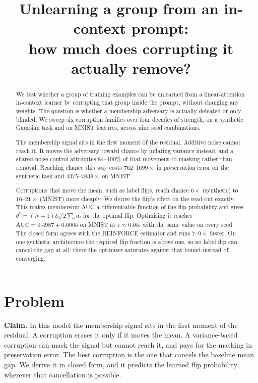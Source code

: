 \documentclass[11pt,a4paper]{article}
\title{\vspace{-1.4cm}\textbf{Unlearning a group from an in-context prompt:\\
how much does corrupting it actually remove?}}
\author{}
\date{}
\begin{document}
\maketitle
\vspace{-1.3cm}

\begin{abstract}
\noindent
We test whether a group of training examples can be unlearned from a
linear-attention in-context learner by corrupting that group inside the prompt,
without changing any weights. The question is whether a membership adversary is
actually defeated or only blinded. We sweep six corruption families over four
decades of strength, on a synthetic Gaussian task and on MNIST features, across
nine seed combinations.

The membership signal sits in the first moment of the residual. Additive noise
cannot reach it. It moves the adversary toward chance by inflating variance
instead, and a shared-noise control attributes $84$--$100\%$ of that movement to
masking rather than removal. Reaching chance this way costs $762$--$1699\times$
in preservation error on the synthetic task and $4375$--$7838\times$ on MNIST.

Corruptions that move the mean, such as label flips, reach chance $6\times$
(synthetic) to $16$--$21\times$ (MNIST) more cheaply. We derive the flip's
effect on the read-out exactly. This makes membership AUC a differentiable
function of the flip probability and gives $\theta^*=(N+1)\delta_0/2\sum_i a_i$
for the optimal flip. Optimising it reaches
$\mathrm{AUC}=0.4987\pm0.0005$ on MNIST at $\varepsilon\approx0.05$, with the
same value on every seed. The closed form agrees with the REINFORCE estimator
and runs $7$--$9\times$ faster. On one synthetic architecture the required flip
fraction is above one, so no label flip can cancel the gap at all; there the
optimiser saturates against that bound instead of converging.
\end{abstract}

\vspace{2pt}

\section{Problem}

\begin{mdframed}[linewidth=0.8pt,linecolor=black!55,backgroundcolor=black!3,
  innertopmargin=7pt,innerbottommargin=7pt,innerleftmargin=9pt,innerrightmargin=9pt]
\textbf{Claim.} In this model the membership signal sits in the first moment
of the residual. A corruption erases it only if it moves the mean. A
variance-based corruption can mask the signal but cannot reach it, and pays for
the masking in preservation error. The best corruption is the one that cancels
the baseline mean gap. We derive it in closed form, and it predicts the learned
flip probability wherever that cancellation is possible.
\end{mdframed}
\end{document}
